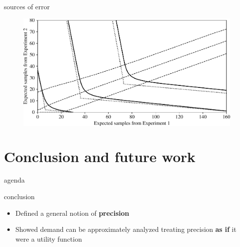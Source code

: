 \documentclass[square,]{gBakerBeamer}
\renewcommand{\|}{\,|\,}
\begin{document}
\begin{frame}{sources of error}

  \begin{figure}[h]
    \centering
    \includegraphics[width=\textwidth]{figures/poissonincexp.pdf}
  \end{figure}

  \note{%

  }
\end{frame}



\section{Conclusion and future work}
\label{sec:conclusion}

\begin{frame}{agenda}

  \tableofcontents[currentsubsection,sectionstyle=show/shaded]

  \note{
  }
\end{frame}


\begin{frame}{conclusion}


  \begin{itemize}
    \item Defined a general notion of \textbf{precision}
    \item Showed demand can be approximately analyzed treating precision \textbf{as if} it were a utility function
  \end{itemize}

  \note{%

  }
\end{frame}
\end{document}
